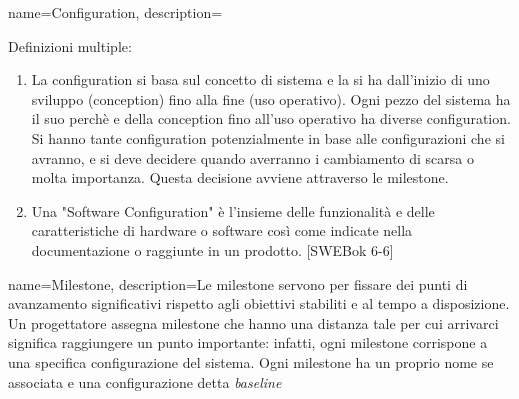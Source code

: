 {
name=Configuration,
description={Definizioni multiple:
\begin{enumerate}
\item La configuration si basa sul concetto di sistema e la si ha dall'inizio di uno sviluppo (conception) fino alla fine (uso operativo). Ogni pezzo del sistema ha il suo perchè e della conception fino all'uso operativo ha diverse configuration. Si hanno tante configuration  potenzialmente in base alle configurazioni che si avranno, e si deve decidere quando averranno i cambiamento di scarsa o molta importanza. Questa decisione avviene attraverso le milestone.
\item Una "Software Configuration" è l'insieme delle funzionalità e delle caratteristiche di hardware o software così come indicate nella documentazione o raggiunte in un prodotto. [SWEBok 6-6]
\end{enumerate}
}
}




{
name=Milestone,
description={Le milestone servono per fissare dei punti di avanzamento significativi rispetto agli obiettivi stabiliti e al tempo a disposizione.
Un progettatore assegna milestone che hanno una distanza tale per cui arrivarci significa raggiungere un punto importante: infatti, ogni milestone corrispone a una specifica configurazione del sistema.
Ogni milestone ha un proprio nome se associata e una configurazione detta \textit{baseline}}
}

